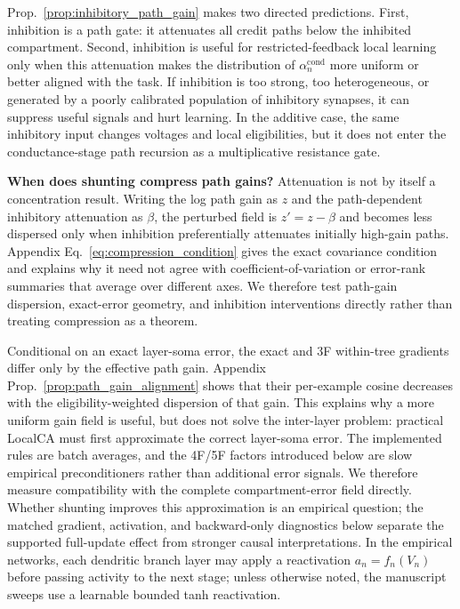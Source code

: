     Prop.~\ref{prop:inhibitory_path_gain} makes two directed predictions. First, inhibition is a path gate: it attenuates all credit paths below the inhibited compartment. Second, inhibition is useful for restricted-feedback local learning only when this attenuation makes the distribution of $\alpha_n^{\mathrm{cond}}$ more uniform or better aligned with the task. If inhibition is too strong, too heterogeneous, or generated by a poorly calibrated population of inhibitory synapses, it can suppress useful signals and hurt learning. In the additive case, the same inhibitory input changes voltages and local eligibilities, but it does not enter the conductance-stage path recursion as a multiplicative resistance gate.
    
    \noindent\textbf{When does shunting compress path gains?}
    Attenuation is not by itself a concentration result. Writing the log path gain as $z$ and the path-dependent inhibitory attenuation as $\beta$, the perturbed field is $z'=z-\beta$ and becomes less dispersed only when inhibition preferentially attenuates initially high-gain paths. Appendix Eq.~\eqref{eq:compression_condition} gives the exact covariance condition and explains why it need not agree with coefficient-of-variation or error-rank summaries that average over different axes. We therefore test path-gain dispersion, exact-error geometry, and inhibition interventions directly rather than treating compression as a theorem.
    
    Conditional on an exact layer-soma error, the exact and 3F within-tree gradients differ only by the effective path gain. Appendix Prop.~\ref{prop:path_gain_alignment} shows that their per-example cosine decreases with the eligibility-weighted dispersion of that gain. This explains why a more uniform gain field is useful, but does not solve the inter-layer problem: practical LocalCA must first approximate the correct layer-soma error. The implemented rules are batch averages, and the 4F/5F factors introduced below are slow empirical preconditioners rather than additional error signals. We therefore measure compatibility with the complete compartment-error field directly.
    Whether shunting improves this approximation is an empirical question; the matched gradient, activation, and backward-only diagnostics below separate the supported full-update effect from stronger causal interpretations.
    In the empirical networks, each dendritic branch layer may apply a reactivation $a_n=f_n(V_n)$ before passing activity to the next stage; unless otherwise noted, the manuscript sweeps use a learnable bounded tanh reactivation.
    
